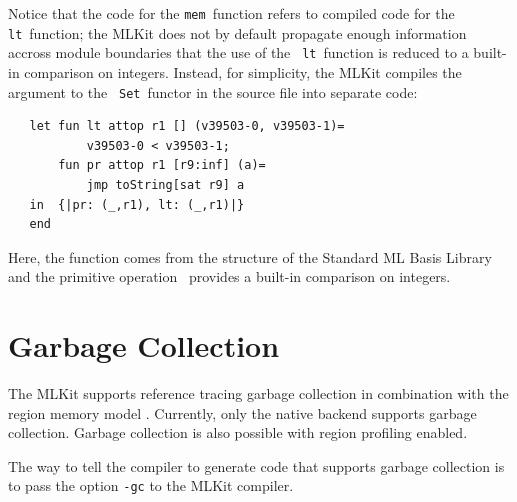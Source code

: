 \documentclass[12pt]{book}
\begin{document}
Notice that the code for the {\tt mem}~function refers to compiled
code for the {\tt lt}~function; the MLKit does not by default propagate
enough information accross module boundaries that the use of the {\tt
  lt}~function is reduced to a built-in comparison on integers.
Instead, for simplicity, the MLKit compiles the argument to the {\tt
  Set}~functor in the source file  into separate
code:
\begin{verbatim}
   let fun lt attop r1 [] (v39503-0, v39503-1)= 
           v39503-0 < v39503-1; 
       fun pr attop r1 [r9:inf] (a)= 
           jmp toString[sat r9] a
   in  {|pr: (_,r1), lt: (_,r1)|}
   end 
\end{verbatim}
Here, the  function comes from the 
structure of the Standard ML Basis Library and the primitive
operation~\boxml{<} provides a built-in comparison on integers.

\chapter{Garbage Collection}
\label{gc.chap}
The MLKit supports reference tracing garbage collection in
combination with the region memory model \cite{hallenberg99,het02}.
Currently, only the native backend supports garbage collection.
Garbage collection is also possible with region profiling enabled.

The way to tell the compiler to generate code that supports garbage
collection is to pass the option \texttt{-gc} to the MLKit compiler.
\end{document}
